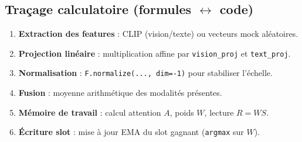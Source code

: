 \documentclass[12pt,a4paper]{article}
\begin{document}
\subsection{Traçage calculatoire (formules $\leftrightarrow$ code)}
\begin{enumerate}[leftmargin=*]
    \item \textbf{Extraction des features} : CLIP (vision/texte) ou vecteurs mock aléatoires.
    \item \textbf{Projection linéaire} : multiplication affine par \texttt{vision\_proj} et \texttt{text\_proj}.
    \item \textbf{Normalisation} : \texttt{F.normalize(..., dim=-1)} pour stabiliser l'échelle.
    \item \textbf{Fusion} : moyenne arithmétique des modalités présentes.
    \item \textbf{Mémoire de travail} : calcul attention $A$, poids $W$, lecture $R=WS$.
    \item \textbf{Écriture slot} : mise à jour EMA du slot gagnant (\texttt{argmax} sur $W$).
\end{enumerate}
\end{document}
